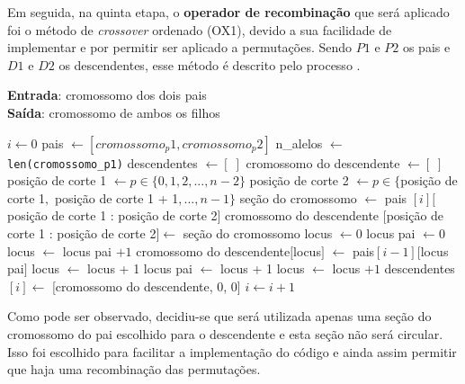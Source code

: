\documentclass[a4paper, 12pt]{article}
\newenvironment{brprocess}[1][]
  {\begin{algorithm}[#1]
     \selectlanguage{brazilian}%
     \floatname{algorithm}{Processo}%
     \renewcommand{\algorithmicif}{\textbf{se}}%
     \renewcommand{\algorithmicfor}{\textbf{para}}%
     \renewcommand{\algorithmicdo}{\textbf{faça}}%
     \renewcommand{\algorithmicthen}{\textbf{faça}}%
     \renewcommand{\algorithmicend}{\textbf{fim}}%
     \renewcommand{\algorithmicwhile}{\textbf{enquanto}}%
     \renewcommand{\algorithmicelse}{\textbf{caso contrário}}%
  }
  {\end{algorithm}}
\begin{document}
Em seguida, na quinta etapa, o \textbf{operador de recombinação} que será aplicado foi o método de \textit{crossover} ordenado (OX1), devido a sua facilidade de implementar e por permitir ser aplicado a permutações. Sendo $P1$ e $P2$ os pais e $D1$ e $D2$ os descendentes, esse método é descrito pelo processo \label{alg:recombinacao}.
\begin{brprocess}[!ht]
    \cprotect\caption{Operador de recombinação (\verb|crossover_ox1(cromossomo_p1,|
    \verb|cromossomo_p2)|)}
    \textbf{Entrada}: cromossomo dos dois pais\\
    \textbf{Saída}: cromossomo de ambos os filhos
    \begin{algorithmic}
        \State $i \gets 0$
        \State pais $\gets [cromossomo_p1, cromossomo_p2]$
        \State n_{alelos} $\gets$ \verb|len(cromossomo_p1)|
        \State descendentes $\gets [\;]$
            \State cromossomo do descendente $\gets [\;]$
            \State posição de corte 1 $\gets p \in \{0, 1, 2, ..., n - 2\}$
            \State posição de corte 2 $\gets p \in \{$posição de corte 1$,$ posição de corte 1 + 1$, ..., n - 1\}$
            \State seção do cromossomo $\gets$ pais $[i][$posição de corte 1 : posição de corte 2$]$
            \State cromossomo do descendente $[$posição de corte 1 : posição de corte 2$] \gets$ seção do cromossomo
            \State locus $\gets 0$
            \State locus pai $\gets 0$
                        \State locus $\gets$ locus pai $+1$
                    \EndWhile
                    \State cromossomo do descendente$[$locus$]$ $\gets $ pais$[i - 1][$locus pai$]$
                    \State locus $\gets$ locus + 1
                    \State locus pai $\gets$ locus + 1
                \Else
                    \State locus $\gets$ locus $+ 1$
                \EndIf
            \EndWhile
            \State descendentes $[i]\gets$ [cromossomo do descendente, 0, 0]
            \State $i \gets i + 1$
        \EndWhile
    \end{algorithmic}
    \label{alg:recombinacao}
\end{brprocess}

Como pode ser observado, decidiu-se que será utilizada apenas uma seção do cromossomo do pai escolhido para o descendente e esta seção não será circular. Isso foi escolhido para facilitar a implementação do código e ainda assim permitir que haja uma recombinação das permutações.
\end{document}
